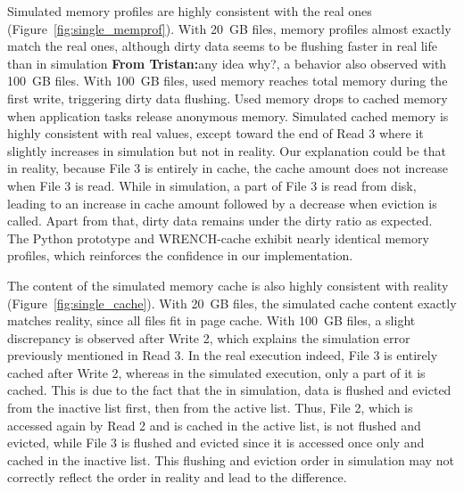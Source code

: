 \documentclass[conference]{IEEEtran}
\newcommand{\tristan}[1]{\color{orange}\textbf{From Tristan:}#1\color{black}}
\newcommand{\wrench}{WRENCH\xspace}
\begin{document}
        Simulated memory profiles are highly consistent with the real ones
        (Figure~\ref{fig:single_memprof}). With 20~GB files, memory
        profiles almost exactly match the real ones, although dirty data
        seems to be flushing faster in real life than in simulation
        \tristan{any idea why?}, a behavior also observed with 100~GB files. With
        100~GB files, used memory reaches total memory during the first write,
        triggering dirty data flushing. Used memory drops to cached memory
        when application tasks release anonymous memory. Simulated cached
        memory is highly consistent with real values, except toward the end
        of Read 3 where it slightly increases in simulation but not in
        reality. Our explanation could be that in reality, because File 3 is
        entirely in cache, the cache amount does not increase when File 3 is read.
        While in simulation, a part of File 3 is read from disk, leading to an increase
        in cache amount followed by a decrease when eviction is called.
        Apart from that, dirty data remains under the dirty ratio as expected. 
        The Python prototype and \wrench-cache exhibit nearly
        identical memory profiles, which reinforces the confidence in our
        implementation.

        The content of the simulated memory cache is also highly consistent
        with reality (Figure~\ref{fig:single_cache}). With 20~GB files, the
        simulated cache content exactly matches reality, since all files fit in page cache. With 100~GB files, a slight
        discrepancy is observed after Write 2, which explains the
        simulation error previously mentioned in Read 3. In the real execution indeed,
        File 3 is entirely cached after Write 2, whereas in the simulated execution, 
        only a part of it is cached. 
        This is due to the fact that the in simulation, data is flushed and evicted 
        from the inactive list first, then from the active list. Thus, File 2, which is 
        accessed again by Read 2 and is cached in the active list, is not flushed and evicted, 
        while File 3 is flushed and evicted since it is accessed once only and cached 
        in the inactive list. 
        This flushing and eviction order in simulation may not correctly reflect the 
        order in reality and lead to the difference.

\end{document}
